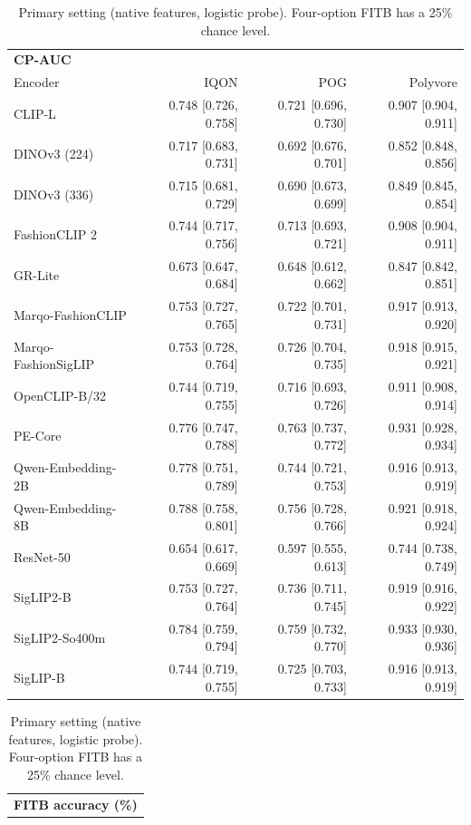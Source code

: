 \begin{table}[htbp]\centering\small
\caption{Primary setting (native features, logistic probe). Four-option FITB has a 25\% chance level.}\label{tab:v2-main}
\setlength{\tabcolsep}{1.8pt}
\begin{tabular}{@{}lrrr@{}}\toprule
\multicolumn{4}{l}{\textbf{CP-AUC}}\\
Encoder & IQON & POG & Polyvore\\\midrule
CLIP-L & 0.748 [0.726, 0.758] & 0.721 [0.696, 0.730] & 0.907 [0.904, 0.911]\\
DINOv3 (224) & 0.717 [0.683, 0.731] & 0.692 [0.676, 0.701] & 0.852 [0.848, 0.856]\\
DINOv3 (336) & 0.715 [0.681, 0.729] & 0.690 [0.673, 0.699] & 0.849 [0.845, 0.854]\\
FashionCLIP 2 & 0.744 [0.717, 0.756] & 0.713 [0.693, 0.721] & 0.908 [0.904, 0.911]\\
GR-Lite & 0.673 [0.647, 0.684] & 0.648 [0.612, 0.662] & 0.847 [0.842, 0.851]\\
Marqo-FashionCLIP & 0.753 [0.727, 0.765] & 0.722 [0.701, 0.731] & 0.917 [0.913, 0.920]\\
Marqo-FashionSigLIP & 0.753 [0.728, 0.764] & 0.726 [0.704, 0.735] & 0.918 [0.915, 0.921]\\
OpenCLIP-B/32 & 0.744 [0.719, 0.755] & 0.716 [0.693, 0.726] & 0.911 [0.908, 0.914]\\
PE-Core & 0.776 [0.747, 0.788] & 0.763 [0.737, 0.772] & 0.931 [0.928, 0.934]\\
Qwen-Embedding-2B & 0.778 [0.751, 0.789] & 0.744 [0.721, 0.753] & 0.916 [0.913, 0.919]\\
Qwen-Embedding-8B & 0.788 [0.758, 0.801] & 0.756 [0.728, 0.766] & 0.921 [0.918, 0.924]\\
ResNet-50 & 0.654 [0.617, 0.669] & 0.597 [0.555, 0.613] & 0.744 [0.738, 0.749]\\
SigLIP2-B & 0.753 [0.727, 0.764] & 0.736 [0.711, 0.745] & 0.919 [0.916, 0.922]\\
SigLIP2-So400m & 0.784 [0.759, 0.794] & 0.759 [0.732, 0.770] & 0.933 [0.930, 0.936]\\
SigLIP-B & 0.744 [0.719, 0.755] & 0.725 [0.703, 0.733] & 0.916 [0.913, 0.919]\\
\bottomrule\end{tabular}\par\medskip
\begin{tabular}{@{}lrrr@{}}\toprule
\multicolumn{4}{l}{\textbf{FITB accuracy (\%)}}\\

\end{tabular}
\end{table}
